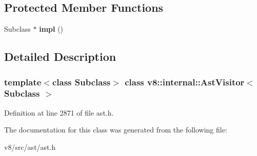 \subsection*{Protected Member Functions}
\begin{DoxyCompactItemize}
\item 
\mbox{\label{classv8_1_1internal_1_1AstVisitor_a11dcc796e72973833f5952180a8068c0}} 
Subclass $\ast$ {\bfseries impl} ()
\end{DoxyCompactItemize}


\subsection{Detailed Description}
\subsubsection*{template$<$class Subclass$>$\newline
class v8\+::internal\+::\+Ast\+Visitor$<$ Subclass $>$}



Definition at line 2871 of file ast.\+h.



The documentation for this class was generated from the following file\+:\begin{DoxyCompactItemize}
\item 
v8/src/ast/ast.\+h\end{DoxyCompactItemize}
